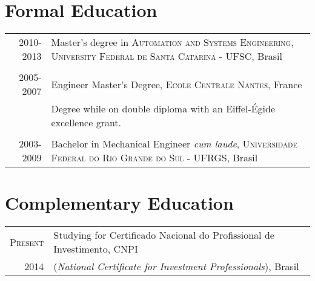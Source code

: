 \documentclass[a4paper,10pt]{article} %
\begin{document}

\section{Formal Education}
\begin{tabular}{rp{11cm}}	
\textsc{2010-2013} & Master's degree in \textsc{Automation and Systems
  Engineering}, \textsc{University Federal de Santa Catarina} - UFSC,
Brasil\\

&\\


\textsc{2005-2007} & Engineer Master's Degree, \textsc{Ecole Centrale Nantes}, France\\
& Degree while on double diploma with an Eiffel-Égide excellence grant.\\
&\\


\textsc{2003-2009} & Bachelor in Mechanical Engineer \textit{cum laude},
\textsc{Universidade Federal do Rio Grande do Sul} - UFRGS, Brasil \\
 
\end{tabular}


\section{Complementary Education}
\begin{tabular}{rp{11cm}}	
\textsc{Present} & Studying for Certificado Nacional do Profissional
de Investimento, CNPI \\
2014 & (\textit{National Certificate for Investment Professionals}),
Brasil\\
 
\end{tabular}
\end{document}
